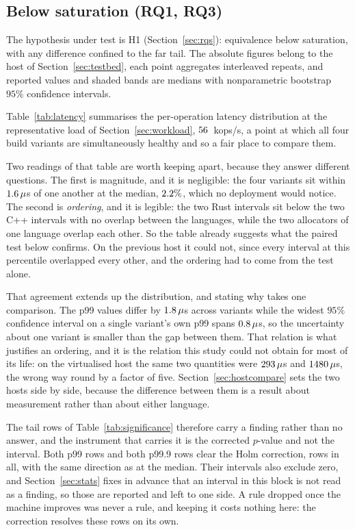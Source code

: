 \documentclass[english,oneside,a4paper,censored,csm,software-track-2020]{HYthesisML}
\begin{document}
\subsection{Below saturation (RQ1, RQ3)}\label{sec:perfresults}
The hypothesis under test is H1 (Section~\ref{sec:rqs}): equivalence below saturation, with any
difference confined to the far tail. The absolute figures belong to the host of
Section~\ref{sec:testbed}, each point aggregates \NRepeats{} interleaved repeats, and reported
values and shaded bands are medians with nonparametric bootstrap $95\%$ confidence intervals.

Table~\ref{tab:latency} summarises the per-operation latency distribution at the representative
load of Section~\ref{sec:workload}, $56$~kops/s, a point at which all four build
variants are simultaneously healthy and so a fair place to compare them.

Two readings of that table are worth keeping apart, because they answer different questions. The
first is magnitude, and it is negligible: the four variants sit within $1.6\,\mu$s of one
another at the median, $2.2\%$, which no deployment would notice. The second is
\emph{ordering}, and it is legible: the two Rust intervals sit below the two C++ intervals with no
overlap between the languages, while the two allocators of one language overlap each other. So the
table already suggests what the paired test below confirms. On the previous host it could not, since
every interval at this percentile overlapped every other, and the ordering had to come from the test
alone.

That agreement extends up the distribution, and stating why takes one comparison. The p99
values differ by $1.8\,\mu$s across variants while the widest $95\%$ confidence
interval on a single variant's own p99 spans $0.8\,\mu$s, so the uncertainty about one
variant is smaller than the gap between them. That relation is what justifies an ordering, and it is
the relation this study could not obtain for most of its life: on the virtualised host the same two
quantities were $293\,\mu$s and $1480\,\mu$s, the wrong way round
by a factor of five. Section~\ref{sec:hostcompare} sets the two hosts side by side, because the
difference between them is a result about measurement rather than about either language.

The tail rows of Table~\ref{tab:significance} therefore carry a finding rather than no answer, and the
instrument that carries it is the corrected $p$-value and not the interval. Both p99 rows and both
p99.9 rows clear the Holm correction, \NTailSignificant{} rows in all, with the same direction as at
the median. Their intervals also exclude zero, and Section~\ref{sec:stats} fixes in advance that an
interval in this block is not read as a finding, so those are reported and left to one side. A rule
dropped once the machine improves was never a rule, and keeping it costs nothing here: the correction
resolves these rows on its own.
\end{document}

